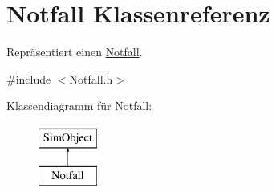 \hypertarget{classNotfall}{}\section{Notfall Klassenreferenz}
\label{classNotfall}


Repräsentiert einen \hyperlink{classNotfall}{Notfall}.  




{\ttfamily \#include $<$Notfall.\+h$>$}

Klassendiagramm für Notfall\+:\begin{figure}[H]
\begin{center}
\leavevmode
\includegraphics[height=2.000000cm]{classNotfall}
\end{center}
\end{figure}
